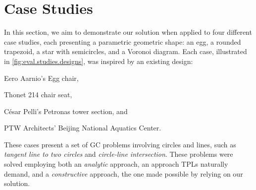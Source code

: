 \section{Case Studies}%
\label{sec:eval.studies}

In this section, we aim to demonstrate our solution when applied to four
different case studies, each presenting a parametric geometric shape: an egg, a
rounded trapezoid, a star with semicircles, and a Voronoi diagram.  Each case,
illustrated in \cref{fig:eval.studies.designs}, was inspired by an existing
design:
\begin{enumerate*}[label= (\arabic*)]
  \item Eero Aarnio's Egg chair, 
  \item Thonet 214 chair seat,
  \item César Pelli's Petronas tower section, and
  \item PTW Architects' Beijing National Aquatics Center.
\end{enumerate*}
These cases present a set of \ac{GC} problems involving circles and lines, such
as \textit{tangent line to two circles} and \textit{circle-line intersection}.
These problems were solved employing both an \textit{analytic} approach, an
approach \acp{TPL} naturally demand, and a \textit{constructive} approach, the
one made possible by relying on our solution.

